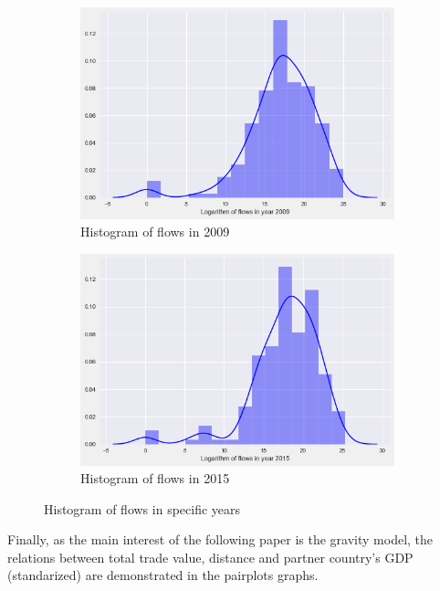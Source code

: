 \documentclass{Trade_template}
\numberwithin{equation}{section}
\begin{document}
\begin{figure}[H]
\begin{subfigure}[b]{0.475\textwidth}
            \centering 
            \includegraphics[width=\textwidth]{Histogram2009}
             \caption[Histogram of flows in 2009]%
            {{\small Histogram of flows in 2009}}    
            \label{hist2009}
        \end{subfigure}
        \quad
        \begin{subfigure}[b]{0.475\textwidth}   
            \centering 
            \includegraphics[width=\textwidth]{Histogram2015}
             \caption[Histogram of flows in 2015]%
            {{\small Histogram of flows in 2015}}    
            \label{hist2015}
        \end{subfigure}
        \caption[Histogram of flows in specific years]
        {\small Histogram of flows in specific years} 
        \label{hist_specific}
    \end{figure}

Finally, as the main interest of the following paper is the gravity model, the relations between total trade value, distance and partner country's GDP (standarized) are demonstrated in the pairplots graphs.
\end{document}
